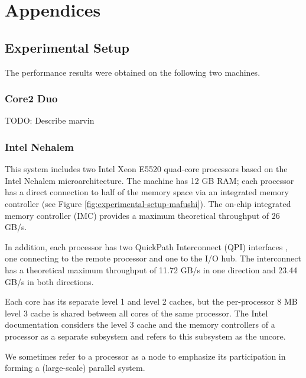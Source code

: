 
\part{Appendices}
\label{part:appendices}

\chapter{Experimental Setup}
\label{chap:experimental-setup}

The performance results were obtained on the following two machines.

\section{Core2 Duo}
\label{sec:experimental-setup-marvin}

TODO: Describe marvin

\section{Intel Nehalem}
\label{sec:experimental-setup-mafushi}

This system includes two Intel Xeon E5520 quad-core processors based
on the Intel Nehalem microarchitecture. The machine has 12 GB RAM;
each processor has a direct connection to half of the memory space via
an integrated memory controller (see Figure
\ref{fig:experimental-setup-mafushi}). The on-chip integrated memory
controller (IMC) provides a maximum theoretical throughput of 26 GB/s.

In addition, each processor has two QuickPath Interconnect (QPI)
interfaces \cite{TODO}, one connecting to the remote processor and one
to the I/O hub. The interconnect has a theoretical maximum throughput
of 11.72 GB/s in one direction and 23.44 GB/s in both directions. 

Each core has its separate level 1 and level 2 caches, but the
per-processor 8 MB level 3 cache is shared between all cores of the
same processor. The Intel documentation considers the level 3 cache
and the memory controllers of a processor as a separate subsystem and
refers to this subsystem as the uncore. 

We sometimes refer to a processor as a node to emphasize its
participation in forming a (large-scale) parallel system.


